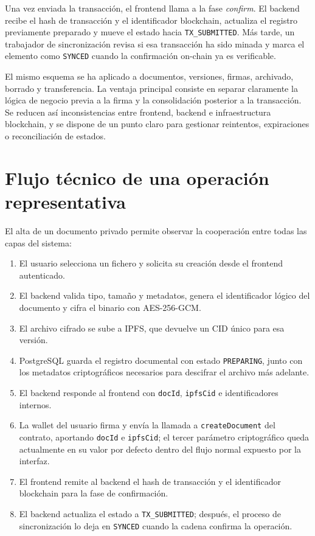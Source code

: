 \documentclass[11pt, a4paper]{article}
\begin{document}
Una vez enviada la transacción, el frontend llama a la fase \textit{confirm}. El backend recibe el hash de transacción y el identificador blockchain, actualiza el registro previamente preparado y mueve el estado hacia \texttt{TX\_SUBMITTED}. Más tarde, un trabajador de sincronización revisa si esa transacción ha sido minada y marca el elemento como \texttt{SYNCED} cuando la confirmación on-chain ya es verificable.

El mismo esquema se ha aplicado a documentos, versiones, firmas, archivado, borrado y transferencia. La ventaja principal consiste en separar claramente la lógica de negocio previa a la firma y la consolidación posterior a la transacción. Se reducen así inconsistencias entre frontend, backend e infraestructura blockchain, y se dispone de un punto claro para gestionar reintentos, expiraciones o reconciliación de estados.

\section{Flujo técnico de una operación representativa}

El alta de un documento privado permite observar la cooperación entre todas las capas del sistema:

\begin{enumerate}
    \item El usuario selecciona un fichero y solicita su creación desde el frontend autenticado.
    \item El backend valida tipo, tamaño y metadatos, genera el identificador lógico del documento y cifra el binario con AES-256-GCM.
    \item El archivo cifrado se sube a IPFS, que devuelve un CID único para esa versión.
    \item PostgreSQL guarda el registro documental con estado \texttt{PREPARING}, junto con los metadatos criptográficos necesarios para descifrar el archivo más adelante.
    \item El backend responde al frontend con \texttt{docId}, \texttt{ipfsCid} e identificadores internos.
    \item La wallet del usuario firma y envía la llamada a \texttt{createDocument} del contrato, aportando \texttt{docId} e \texttt{ipfsCid}; el tercer parámetro criptográfico queda actualmente en su valor por defecto dentro del flujo normal expuesto por la interfaz.
    \item El frontend remite al backend el hash de transacción y el identificador blockchain para la fase de confirmación.
    \item El backend actualiza el estado a \texttt{TX\_SUBMITTED}; después, el proceso de sincronización lo deja en \texttt{SYNCED} cuando la cadena confirma la operación.
\end{enumerate}
\end{document}
